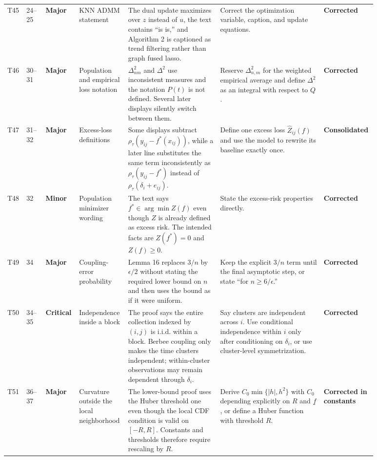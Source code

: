 \documentclass[11pt]{article}
\newcommand{\status}[1]{\textcolor{implgreen}{\textbf{#1}}}
\begin{document}
\begin{landscape}
\begin{longtable}{L{0.04\linewidth}L{0.055\linewidth}L{0.065\linewidth}L{0.11\linewidth}L{0.245\linewidth}L{0.275\linewidth}L{0.095\linewidth}}
T45 & 24--25 & \textcolor{major}{\textbf{Major}} & KNN ADMM statement & The dual update maximizes over $z$ instead of $u$, the text contains “is is,” and Algorithm 2 is captioned as trend filtering rather than graph fused lasso. & Correct the optimization variable, caption, and update equations. & \status{Corrected}\\
T46 & 30--31 & \textcolor{major}{\textbf{Major}} & Population and empirical loss notation & $\Delta_{nm}^2$ and $\Delta^2$ use inconsistent measures and the notation $P(t)$ is not defined. Several later displays silently switch between them. & Reserve $\Delta_{n,m}^2$ for the weighted empirical average and define $\Delta^2$ as an integral with respect to $Q$. & \status{Corrected}\\
T47 & 31--32 & \textcolor{major}{\textbf{Major}} & Excess-loss definitions & Some displays subtract $\rho_\tau(y_{ij}-f^*(x_{ij}))$, while a later line substitutes the same term inconsistently as $\rho_\tau(y_{ij}-f^*)$ instead of $\rho_\tau(\delta_i+e_{ij})$. & Define one excess loss $\widehat Z_{ij}(f)$ and use the model to rewrite its baseline exactly once. & \status{Consolidated}\\
T48 & 32 & \textcolor{minor}{\textbf{Minor}} & Population minimizer wording & The text says $f^*\in\arg\min Z(f)$ even though $Z$ is already defined as excess risk. The intended facts are $Z(f^*)=0$ and $Z(f)\ge0$. & State the excess-risk properties directly. & \status{Corrected}\\
T49 & 34 & \textcolor{major}{\textbf{Major}} & Coupling-error probability & Lemma 16 replaces $3/n$ by $\epsilon/2$ without stating the required lower bound on $n$ and then uses the bound as if it were uniform. & Keep the explicit $3/n$ term until the final asymptotic step, or state “for $n\ge6/\epsilon$.” & \status{Corrected}\\
T50 & 34--35 & \textcolor{crit}{\textbf{Critical}} & Independence inside a block & The proof says the entire collection indexed by $(i,j)$ is i.i.d. within a block. Berbee coupling only makes the time clusters independent; within-cluster observations may remain dependent through $\delta_i$. & Say clusters are independent across $i$. Use conditional independence within $i$ only after conditioning on $\delta_i$, or use cluster-level symmetrization. & \status{Corrected}\\
T51 & 36--37 & \textcolor{major}{\textbf{Major}} & Curvature outside the local neighborhood & The lower-bound proof uses the Huber threshold one even though the local CDF condition is valid on $[-R,R]$. Constants and thresholds therefore require rescaling by $R$. & Derive $C_0\min\{|h|,h^2\}$ with $C_0$ depending explicitly on $R$ and $\underline f$, or define a Huber function with threshold $R$. & \status{Corrected in constants}\\

\end{longtable}
\end{landscape}
\end{document}

